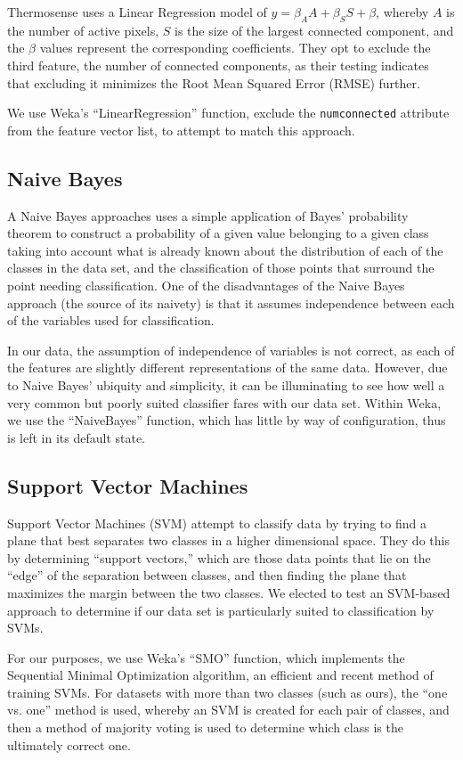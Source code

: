 \documentclass[../thesis/thesis.tex]{subfiles}
\begin{document}
Thermosense uses a Linear Regression model of $y = \beta_A A + \beta_S S + \beta $, whereby $A$ is the number of active pixels, $S$ is the size of the largest connected component, and the $\beta$ values represent the corresponding coefficients. They opt to exclude the third feature, the number of connected components, as their testing indicates that excluding it minimizes the Root Mean Squared Error (RMSE) further. 

We use Weka's ``LinearRegression'' function, exclude the \texttt{numconnected} attribute from the feature vector list, to attempt to match this approach.

\subsection{Naive Bayes}
A Naive Bayes approaches uses a simple application of Bayes' probability theorem to construct a probability of a given value belonging to a given class taking into account what is already known about the distribution of each of the classes in the data set, and the classification of those points that surround the point needing classification. One of the disadvantages of the Naive Bayes approach (the source of its naivety) is that it assumes independence between each of the variables used for classification.

In our data, the assumption of independence of variables is not correct, as each of the features are slightly different representations of the same data. However, due to Naive Bayes' ubiquity and simplicity, it can be illuminating to see how well a very common but poorly suited classifier fares with our data set. Within Weka, we use the ``NaiveBayes'' function, which has little by way of configuration, thus is left in its default state.

\subsection{Support Vector Machines}
Support Vector Machines (SVM) attempt to classify data by trying to find a plane that best separates two classes in a higher dimensional space. They do this by determining ``support vectors,'' which are those data points that lie on the ``edge'' of the separation between classes, and then finding the plane that maximizes the margin between the two classes. We elected to test an SVM-based approach to determine if our data set is particularly suited to classification by SVMs.

For our purposes, we use Weka's ``SMO'' function, which implements the Sequential Minimal Optimization algorithm, an efficient and recent method of training SVMs. For datasets with more than two classes (such as ours), the ``one vs. one'' method is used, whereby an SVM is created for each pair of classes, and then a method of majority voting is used to determine which class is the ultimately correct one. %
\end{document}

